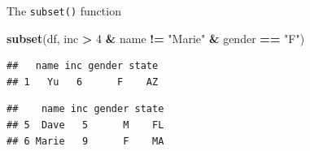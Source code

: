 \documentclass[ignorenonframetext,]{beamer}
\newenvironment{Shaded}{\begin{snugshade}}{\end{snugshade}}
\newcommand{\DecValTok}[1]{\textcolor[rgb]{0.00,0.00,0.81}{#1}}
\newcommand{\KeywordTok}[1]{\textcolor[rgb]{0.13,0.29,0.53}{\textbf{#1}}}
\newcommand{\NormalTok}[1]{#1}
\newcommand{\OperatorTok}[1]{\textcolor[rgb]{0.81,0.36,0.00}{\textbf{#1}}}
\newcommand{\StringTok}[1]{\textcolor[rgb]{0.31,0.60,0.02}{#1}}
\begin{document}
\begin{frame}[fragile]{The \texttt{subset()} function}
\protect\hypertarget{the-subset-function-3}{}

\begin{Shaded}
\begin{Highlighting}[]
\KeywordTok{subset}\NormalTok{(df, inc }\OperatorTok{>}\StringTok{ }\DecValTok{4} \OperatorTok{&}\StringTok{ }\NormalTok{name }\OperatorTok{!=}\StringTok{ "Marie"} \OperatorTok{&}\StringTok{ }\NormalTok{gender }\OperatorTok{==}\StringTok{ "F"}\NormalTok{)}
\end{Highlighting}
\end{Shaded}

\begin{verbatim}
##   name inc gender state
## 1   Yu   6      F    AZ
\end{verbatim}

\begin{Shaded}
\end{Shaded}

\begin{verbatim}
##    name inc gender state
## 5  Dave   5      M    FL
## 6 Marie   9      F    MA
\end{verbatim}

\end{frame}
\end{document}
